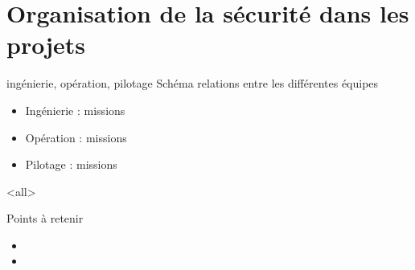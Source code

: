 \section{Organisation de la sécurité dans les projets}
ingénierie, opération, pilotage
Schéma relations entre les différentes équipes
\begin{itemize}
    \item Ingénierie : missions
    \item Opération : missions
    \item Pilotage : missions
\end{itemize}



\mode<all>{\texframe
{Points à retenir} %
{} %
{
\begin{itemize}
    \item
    \item
\end{itemize}
}}

